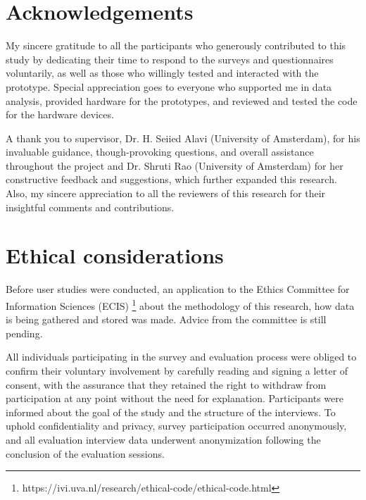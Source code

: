 \onecolumn

\appendix
\begin{appendices}

\section{Acknowledgements}
\label{sec:apx:first_appendix}

My sincere gratitude to all the participants who generously contributed to this study by dedicating their time to respond to the surveys and questionnaires voluntarily, as well as those who willingly tested and interacted with the prototype. Special appreciation goes to everyone who supported me in data analysis, provided hardware for the prototypes, and reviewed and tested the code for the hardware devices.

A thank you to supervisor, Dr. H. Seiied Alavi (University of Amsterdam), for his invaluable guidance, though-provoking questions, and overall assistance throughout the project and Dr. Shruti Rao (University of Amsterdam) for her constructive feedback and suggestions, which further expanded this research. Also, my sincere appreciation to all the reviewers of this research for their insightful comments and contributions.

\section{Ethical considerations}
\label{sec:apx:first_appendix}

Before user studies were conducted, an application to the Ethics Committee for Information Sciences (ECIS) \footnote{https://ivi.uva.nl/research/ethical-code/ethical-code.html} about the methodology of this research, how data is being gathered and stored was made. Advice from the committee is still pending.

All individuals participating in the survey and evaluation process were obliged to confirm their voluntary involvement by carefully reading and signing a letter of consent, with the assurance that they retained the right to withdraw from participation at any point without the need for explanation. Participants were informed about the goal of the study and the structure of the interviews. To uphold confidentiality and privacy, survey participation occurred anonymously, and all evaluation interview data underwent anonymization following the conclusion of the evaluation sessions.


\end{appendices}
